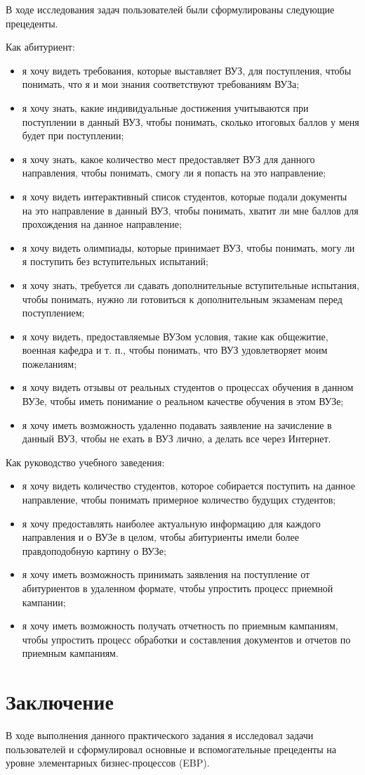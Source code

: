 \documentclass[a4paper, 14pt]{extarticle}
\begin{document}
В ходе исследования задач пользователей были сформулированы следующие прецеденты.

Как абитуриент:
\begin{itemize}
  \item я хочу видеть требования, которые выставляет ВУЗ, для поступления, чтобы
  понимать, что я и мои знания соответствуют требованиям ВУЗа;
  \item я хочу знать, какие индивидуальные достижения учитываются при
  поступлении в данный ВУЗ, чтобы понимать, сколько итоговых баллов у меня будет
  при поступлении;
  \item я хочу знать, какое количество мест предоставляет ВУЗ для данного
  направления, чтобы понимать, смогу ли я попасть на это направление;
  \item я хочу видеть интерактивный список студентов, которые подали документы
  на это направление в данный ВУЗ, чтобы понимать, хватит ли мне баллов для
  прохождения на данное направление;
  \item я хочу видеть олимпиады, которые принимает ВУЗ, чтобы понимать, могу ли
  я поступить без вступительных испытаний;
  \item я хочу знать, требуется ли сдавать дополнительные вступительные
  испытания, чтобы понимать, нужно ли готовиться к дополнительным экзаменам
  перед поступлением;
  \item я хочу видеть, предоставляемые ВУЗом условия, такие как общежитие,
  военная кафедра и т. п., чтобы понимать, что ВУЗ удовлетворяет моим
  пожеланиям;
  \item я хочу видеть отзывы от реальных студентов о процессах обучения в данном
  ВУЗе, чтобы иметь понимание о реальном качестве обучения в этом ВУЗе;
  \item я хочу иметь возможность удаленно подавать заявление на зачисление в
  данный ВУЗ, чтобы не ехать в ВУЗ лично, а делать все через Интернет.
\end{itemize}

Как руководство учебного заведения:
\begin{itemize}
  \item я хочу видеть количество студентов, которое собирается поступить на
  данное направление, чтобы понимать примерное количество будущих студентов;
  \item я хочу предоставлять наиболее актуальную информацию для каждого
  направления и о ВУЗе в целом, чтобы абитуриенты имели более правдоподобную
  картину о ВУЗе;
  \item я хочу иметь возможность принимать заявления на поступление от
  абитуриентов в удаленном формате, чтобы упростить процесс приемной кампании;
  \item я хочу иметь возможность получать отчетность по приемным кампаниям,
  чтобы упростить процесс обработки и составления документов и отчетов по
  приемным кампаниям.
\end{itemize}

\section{Заключение}

В ходе выполнения данного практического задания я исследовал задачи
пользователей и сформулировал основные и вспомогательные прецеденты на уровне
элементарных бизнес-процессов (EBP).
\end{document}
